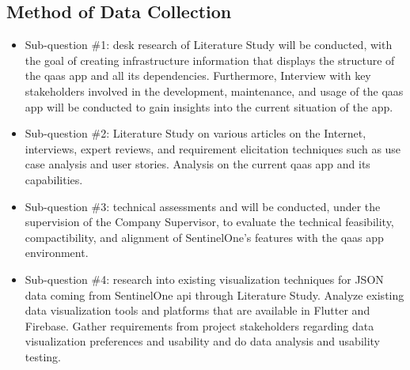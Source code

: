\begin{multicols}{2}
  \subsection{Method of Data Collection}
  \begin{itemize}[label=-]
    \item Sub-question \#1: desk research of Literature Study will be conducted, with the goal of creating
          infrastructure information that displays the structure of the \acrshort{qaas} app and all its
          dependencies. Furthermore, Interview with key stakeholders involved in the  development, maintenance,
          and usage of the \acrshort{qaas} app will be conducted to gain insights into the current situation
          of the app.
    \item Sub-question \#2: Literature Study on various articles on the Internet, interviews, expert reviews,
          and requirement elicitation techniques such as use case analysis and user stories. Analysis on the
          current \acrshort{qaas} app and its capabilities.
    \item Sub-question \#3: technical assessments and will be conducted, under the supervision of the Company
          Supervisor, to evaluate the technical feasibility, compactibility, and alignment of SentinelOne's
          features with the \acrshort{qaas} app environment.
    \item Sub-question \#4: research into existing visualization techniques for \gls{JSON} data coming from
          SentinelOne \acrshort{api} through Literature Study. Analyze existing data visualization tools and
          platforms that are available in Flutter and Firebase. Gather requirements from project stakeholders
          regarding data visualization preferences and usability and do data analysis and usability testing.

\end{itemize}
\end{multicols}
